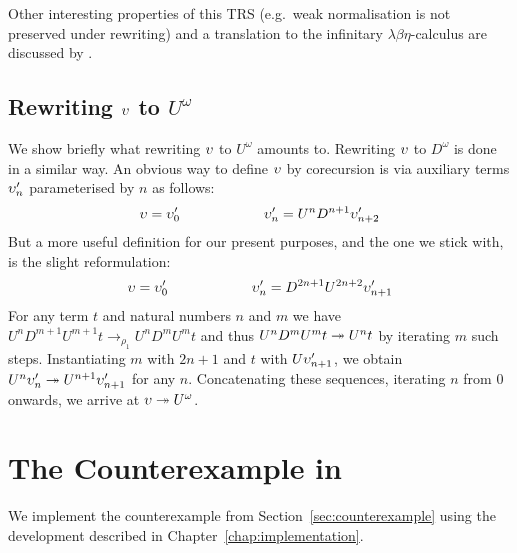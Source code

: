 Other interesting properties of this TRS (e.g.\ weak normalisation is
not preserved under rewriting) and a translation to the infinitary
$\lambda \beta \eta$-calculus are discussed by \citet{endrullis-10}.


\subsection{\texorpdfstring{Rewriting $\upsilon$ to
    $U^\omega$}{Rewriting DUUDDD... to
    UUU...}}\label{sub:counterexample}

We show briefly what rewriting $\upsilon$ to $U^\omega$ amounts
to. Rewriting $\upsilon$ to $D^\omega$ is done in a similar way.
An obvious way to define $\upsilon$ by corecursion is via auxiliary terms
$\upsilon'_n$ parameterised by $n$ as follows:
\begin{align*}
  \upsilon = \upsilon'_0 \qquad \qquad \qquad
  \upsilon'_n = U^n D^{n + 1} \upsilon'_{n + 2}
\end{align*}
But a more useful definition for our present purposes, and the one we
stick with, is the slight reformulation:
\begin{align*}
  \upsilon = \upsilon'_0 \qquad \qquad \qquad
  \upsilon'_n = D^{2 n + 1} U^{2 n + 2} \upsilon'_{n + 1}
\end{align*}
For any term $t$ and natural numbers $n$ and $m$ we have $U^n D^{m+1}
U^{m+1} t \rightarrow_{\rho_1} U^n D^m U^m t$ and thus $U^n D^m U^m t
\twoheadrightarrow U^n t$ by iterating $m$ such steps. Instantiating
$m$ with $2 n + 1$ and $t$ with $U \upsilon'_{n + 1}$, we obtain
$U^n \upsilon'_n \twoheadrightarrow U^{n+1} \upsilon'_{n + 1}$ for any $n$.
Concatenating these sequences, iterating $n$ from $0$ onwards, we
arrive at $\upsilon \twoheadrightarrow U^\omega$.


\section{The Counterexample in \Coq}

We implement the counterexample from Section~\ref{sec:counterexample}
using the \Coq development described in
Chapter~\ref{chap:implementation}.

